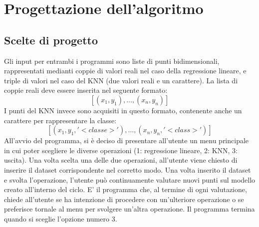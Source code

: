 \documentclass[11pt]{article}
\theoremstyle{definition}
\begin{document}
\newpage

\section{Progettazione dell'algoritmo}

\subsection{Scelte di progetto}
Gli input per entrambi i programmi sono liste di punti bidimensionali, rappresentati medianti coppie di valori reali nel caso della regressione lineare, e triple di valori nel caso del KNN (due valori reali e un carattere). La lista di coppie reali deve essere inserita nel seguente formato:
$$
[(x_1, y_1), \dots, (x_n, y_n)]
$$
I punti del KNN invece sono acquisiti in questo formato, contenente anche un carattere per rappresentare la classe:
$$
[(x_1, y_1, '<classe>'), \dots, (x_n, y_n, '<class>')]
$$
All'avvio del programma, si è deciso di presentare all'utente un menu principale in cui poter scegliere le diverse operazioni (1: regressione lineare, 2: KNN, 3: uscita). Una volta scelta una delle due operazioni, all'utente viene chiesto di inserire il dataset corrispondente nel corretto modo. Una volta inserito il dataset e svolta l'operazione, l'utente può continuamente valutare nuovi punti sul modello creato all'interno del ciclo. E' il programma che, al termine di ogni valutazione, chiede all'utente se ha intenzione di procedere con un'ulteriore operazione o se preferisce tornale al menu per svolgere un'altra operazione. Il programma termina quando si sceglie l'opzione numero 3.

\newpage
\end{document}
